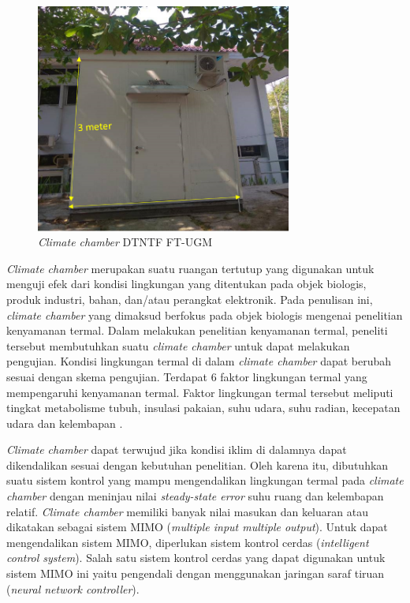 \begin{figure}[!h]
	\centering
	\includegraphics[width=0.75\textwidth]{figures/climatechamber}
	\caption{\textit{Climate chamber} DTNTF FT-UGM}
	\label{fig:1:climatechamber}
\end{figure}

\textit{Climate chamber} merupakan suatu ruangan tertutup yang digunakan untuk menguji efek dari kondisi lingkungan yang ditentukan pada objek biologis, produk industri, bahan, dan/atau perangkat elektronik. Pada penulisan ini, \textit{climate chamber} yang dimaksud berfokus pada objek biologis mengenai penelitian kenyamanan termal. Dalam melakukan penelitian kenyamanan termal, peneliti tersebut membutuhkan suatu \textit{climate chamber} untuk dapat melakukan pengujian. Kondisi lingkungan termal di dalam \textit{climate chamber} dapat berubah sesuai dengan skema pengujian. Terdapat 6 faktor lingkungan termal yang mempengaruhi kenyamanan termal. Faktor lingkungan termal tersebut meliputi tingkat metabolisme tubuh, insulasi pakaian, suhu udara, suhu radian, kecepatan udara dan kelembapan \cite{ASHRAE55}.

\textit{Climate chamber} dapat terwujud jika kondisi iklim di dalamnya dapat dikendalikan sesuai dengan kebutuhan penelitian. Oleh karena itu, dibutuhkan suatu sistem kontrol yang mampu mengendalikan lingkungan termal pada \textit{climate chamber} dengan meninjau nilai \textit{steady-state error} suhu ruang dan kelembapan relatif. \textit{Climate chamber} memiliki banyak nilai masukan dan keluaran atau dikatakan sebagai sistem MIMO (\textit{multiple input multiple output}). Untuk dapat mengendalikan sistem MIMO, diperlukan sistem kontrol cerdas (\textit{intelligent control system}). Salah satu sistem kontrol cerdas yang dapat digunakan untuk sistem MIMO ini yaitu pengendali dengan menggunakan jaringan saraf tiruan (\textit{neural network controller}).

